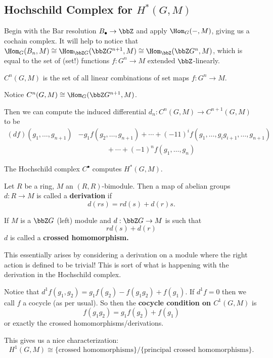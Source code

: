 \documentclass[12pt]{article}
\begin{document}
\subsection{Hochschild Complex for $H^\ast(G,M)$}
Begin with the Bar resolution $B_\bullet\to \bbZ$ and apply $\Hom_G(-,M)$, giving us a cochain complex. It will help to notice 
that $\Hom_G(B_n,M)\cong\Hom_{\bbZ G}(\bbZ G^{n+1},M)\cong\Hom_\bbZ(\bbZ G^n,M)$, which is equal to the set of 
(set!) functions $f:G^n\to M$ extended $\bbZ$-linearly. 
\begin{defn}
	$C^n(G,M)$ is the set of all linear combinations of set maps $f:G^n\to M$.
\end{defn}
\begin{rmk}
	Notice $C^n(G,M)\cong \Hom_G(\bbZ G^{n+1},M)$.
\end{rmk}
Then we can compute the induced differential $d_n:C^n(G,M)\to C^{n+1}(G,M)$ to be 
\begin{align*}
	(df)(g_1,\dots,g_{n+1})&- g_1f(g_2,\dots,g_{n+1})+\cdots+(-11)^if(g_1,\dots,g_ig_{i+1},\dots,g_{n+1})\\
	&\qquad\qquad+\cdots+(-1)^nf(g_1,\dots,g_n)
\end{align*}

\begin{cor}
	The Hochschild complex $C^\bullet$ computes $H^\ast(G,M).$
\end{cor}

\begin{defn}
	Let $R$ be a ring, $M$ an $(R,R)$-bimodule. Then a map of abelian groups $d:R\to M$ is called 
	a \textbf{derivation} if
	\[d(rs)=rd(s)+d(r)s.\]
\end{defn}
\begin{defn}
	If $M$ is a $\bbZ G$ (left) module and $d:\bbZ G\to M$ is such that 
	\[rd(s)+d(r)\]
	$d$ is called a \textbf{crossed homomorphism.}
\end{defn}
\begin{rmk}
	This essentially arises by considering a derivation on a module where the right action is defined to be trivial! This is sort of what is happening
	with the derivation in the Hochschild complex.
\end{rmk}
\begin{rmk}
	Notice that $d^1f(g_1,g_2)=g_1f(g_2)-f(g_1g_2)+f(g_1)$. If $d^1f=0$ then we call $f$ a cocycle (as per usual).
	So then the \textbf{cocycle condition on $C^1(G,M)$} is 
	\[f(g_1g_2)=g_1f(g_2)+f(g_1)\]
	or exactly the crossed homomorphisms/derivations.

	This gives us a nice characterization:
	\[H^1(G,M)\cong\{\text{crossed homomorphisms}\}/\{\text{principal crossed homomorphisms}\}.\]
\end{rmk}	
\end{document}
